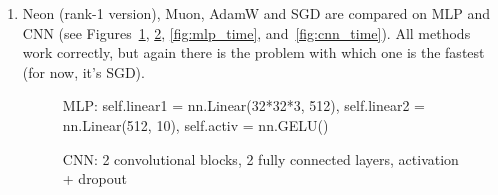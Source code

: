 \documentclass{article} %
\begin{document}
\begin{enumerate}
    \item Neon (rank-1 version), Muon, AdamW and SGD are compared on MLP and CNN (see Figures~\ref{fig:mlp_epochs}, \ref{fig:cnn_epochs}, \ref{fig:mlp_time}, and~\ref{fig:cnn_time}). All methods work correctly, but again there is the problem with which one is the fastest (for now, it's SGD).
    \begin{figure}[h!]
        \caption{MLP: self.linear1 = nn.Linear(32*32*3, 512), self.linear2 = nn.Linear(512, 10), self.activ = nn.GELU()}
        \label{fig:mlp_epochs}
    \end{figure}
    \begin{figure}[h!]
        \caption{CNN: 2 convolutional blocks, 2 fully connected layers, activation + dropout}
        \label{fig:cnn_epochs}
    \end{figure}
    \begin{figure}[h!]

\end{figure}
\end{enumerate}
\end{document}

